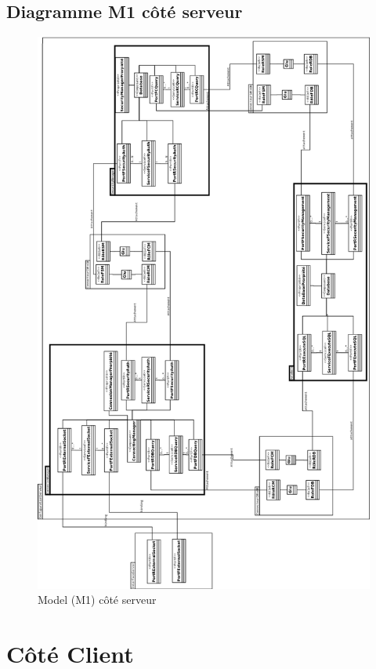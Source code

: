 \subsection{Diagramme M1 côté serveur}
\pagestyle{fancy}
\clearpage
\pagestyle{empty}
{
\begin{figure}[htb]
  \centering
  \includegraphics[scale=0.20]{img/M1}
  \caption{Model (M1) côté serveur}
  \label{fig:M1}
\end{figure}
}
\clearpage

\pagestyle{fancy}
\section{Côté Client}
